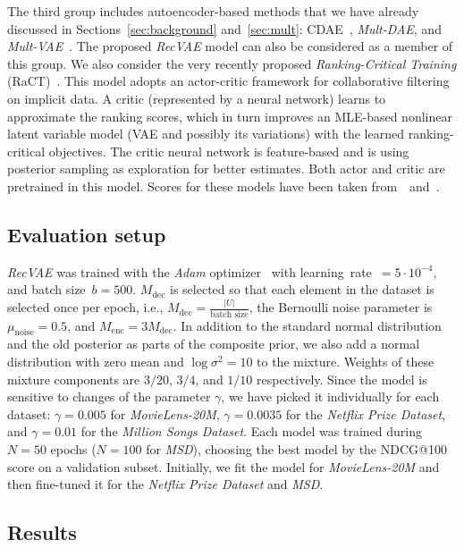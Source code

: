 \documentclass[sigconf,authorversion]{acmart}
\begin{document}
The third group includes autoencoder-based methods that we have already discussed in Sections~\ref{sec:background} and~\ref{sec:mult}: CDAE~\cite{wu2016collaborative}, \emph{Mult-DAE}, and \emph{Mult-VAE}~\cite{liang2018variational}. 
The proposed \emph{RecVAE} model can also be considered as a member of this group.
We also consider the very recently proposed \emph{Ranking-Critical Training} (RaCT)~\cite{lobel2019towards}. This model adopts an actor-critic framework for collaborative filtering on implicit data. A critic (represented by a neural network) learns to approximate the ranking scores, which in turn improves an MLE-based nonlinear latent variable model (VAE and possibly its variations) with the learned ranking-critical objectives. The critic neural network is feature-based and is using posterior sampling as exploration for better estimates. Both actor and critic are pretrained in this model.
Scores for these models have been taken from~\cite{liang2018variational}~and~\cite{lobel2019towards}.

\subsection{Evaluation setup}

\emph{RecVAE} was trained with the \emph{Adam} optimizer~\cite{DBLP:journals/corr/KingmaB14} with learning~rate~$=5\cdot10^{-4}$, and batch size~$b=500$.
$M_{\mathrm{dec}}$ is selected so that each element in the dataset is selected once per epoch, i.e., $M_{\mathrm{dec}}=\frac{|U|}{\textrm{batch size}}$, the Bernoulli noise parameter is $\mu_{\mathrm{noise}}=0.5$, and $M_{\mathrm{enc}}=3M_{\mathrm{dec}}$. In addition to the standard normal distribution and the old posterior as parts of the composite prior, we also add a normal distribution with zero mean and $\log\sigma^2=10$ to the mixture. Weights of these mixture components are $3/20$, $3/4$, and $1/10$ respectively.
Since the model is sensitive to changes of the parameter $\gamma$, we have picked it individually for each dataset: $\gamma = 0.005$ for \emph{MovieLens-20M}, $\gamma = 0.0035$ for the \emph{Netflix Prize Dataset}, and $\gamma = 0.01$ for the \emph{Million Songs Dataset}. Each model was trained during $N=50$ epochs ($N=100$ for \emph{MSD}), choosing the best model by the NDCG@100 score on a validation subset. Initially, we fit the model for \emph{MovieLens-20M} and then fine-tuned it for the \emph{Netflix Prize Dataset} and \emph{MSD}.

\subsection{Results}
\end{document}
